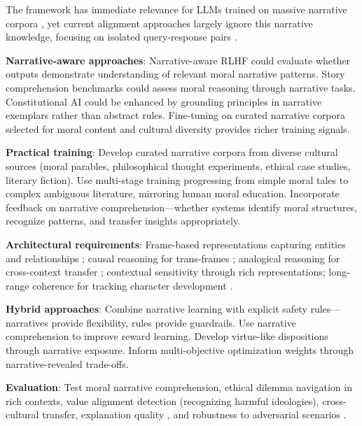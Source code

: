 \documentclass[12pt]{article}
\begin{document}
The framework has immediate relevance for LLMs trained on massive narrative corpora \citep{brown2020language, openai2023gpt4}, yet current alignment approaches largely ignore this narrative knowledge, focusing on isolated query-response pairs \citep{ouyang2022training}.

\textbf{Narrative-aware approaches}: Narrative-aware RLHF could evaluate whether outputs demonstrate understanding of relevant moral narrative patterns. Story comprehension benchmarks \citep{hendrycks2021aligning, sap2019socialiqa, emelin2021moral} could assess moral reasoning through narrative tasks. Constitutional AI \citep{bai2022constitutional} could be enhanced by grounding principles in narrative exemplars rather than abstract rules. Fine-tuning on curated narrative corpora selected for moral content and cultural diversity provides richer training signals.

\textbf{Practical training}: Develop curated narrative corpora from diverse cultural sources (moral parables, philosophical thought experiments, ethical case studies, literary fiction). Use multi-stage training progressing from simple moral tales to complex ambiguous literature, mirroring human moral education. Incorporate feedback on narrative comprehension---whether systems identify moral structures, recognize patterns, and transfer insights appropriately.

\textbf{Architectural requirements}: Frame-based representations capturing entities and relationships \citep{garcez2019neurosymbolic}; causal reasoning for trans-frames \citep{scholkopf2021toward, pearl2009causality}; analogical reasoning for cross-context transfer \citep{gentner1983structure, webb2021emergent}; contextual sensitivity through rich representations; long-range coherence for tracking character development \citep{vaswani2017attention}.

\textbf{Hybrid approaches}: Combine narrative learning with explicit safety rules---narratives provide flexibility, rules provide guardrails. Use narrative comprehension to improve reward learning. Develop virtue-like dispositions through narrative exposure. Inform multi-objective optimization weights through narrative-revealed trade-offs.

\textbf{Evaluation}: Test moral narrative comprehension, ethical dilemma navigation in rich contexts, value alignment detection (recognizing harmful ideologies), cross-cultural transfer, explanation quality \citep{mittelstadt2019explaining}, and robustness to adversarial scenarios \citep{kenton2021alignment}.
\end{document}
